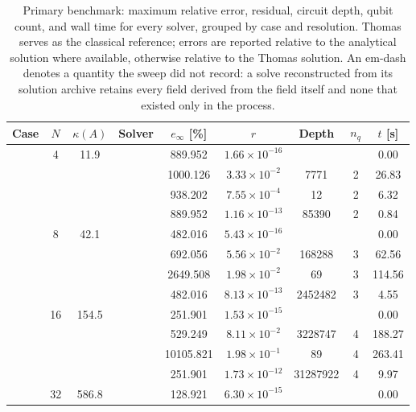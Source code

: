 \begin{table}[htbp]
  \centering
  \caption{Primary benchmark: maximum relative error, residual, circuit depth, qubit count, and wall time for every solver, grouped by case and resolution. Thomas serves as the classical reference; errors are reported relative to the analytical solution where available, otherwise relative to the Thomas solution. An em-dash denotes a quantity the sweep did not record: a solve reconstructed from its solution archive retains every field derived from the field itself and none that existed only in the process.}
  \label{tab:primary_comparison}
  \begin{tabular}{l S[table-format=3.0] S[table-format=4.1] l S[table-format=3.3] S[table-format=1.2e2] S[table-format=6.0] S[table-format=2.0] S[table-format=4.2]}
    \toprule
    {Case} & {$N$} & {$\kappa(A)$} & {Solver} & {$e_\infty$ [\%]} & {$r$} & {Depth} & {$n_q$} & {$t$ [s]} \\
    \midrule
     & 4 & 11.9 &  & 889.952 & $1.66 \times 10^{-16}$ & {\text{---}} & {\text{---}} & 0.00 \\
     &  &  &  & 1000.126 & $3.33 \times 10^{-2}$ & 7771 & 2 & 26.83 \\
     &  &  &  & 938.202 & $7.55 \times 10^{-4}$ & 12 & 2 & 6.32 \\
     &  &  &  & 889.952 & $1.16 \times 10^{-13}$ & 85390 & 2 & 0.84 \\
     & 8 & 42.1 &  & 482.016 & $5.43 \times 10^{-16}$ & {\text{---}} & {\text{---}} & 0.00 \\
     &  &  &  & 692.056 & $5.56 \times 10^{-2}$ & 168288 & 3 & 62.56 \\
     &  &  &  & 2649.508 & $1.98 \times 10^{-2}$ & 69 & 3 & 114.56 \\
     &  &  &  & 482.016 & $8.13 \times 10^{-13}$ & 2452482 & 3 & 4.55 \\
     & 16 & 154.5 &  & 251.901 & $1.53 \times 10^{-15}$ & {\text{---}} & {\text{---}} & 0.00 \\
     &  &  &  & 529.249 & $8.11 \times 10^{-2}$ & 3228747 & 4 & 188.27 \\
     &  &  &  & 10105.821 & $1.98 \times 10^{-1}$ & 89 & 4 & 263.41 \\
     &  &  &  & 251.901 & $1.73 \times 10^{-12}$ & 31287922 & 4 & 9.97 \\
     & 32 & 586.8 &  & 128.921 & $6.30 \times 10^{-15}$ & {\text{---}} & {\text{---}} & 0.00 \\

\end{tabular}
\end{table}
